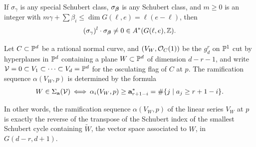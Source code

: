 \begin{corollary}\label{intersection with sigma nonzero}
If $\sigma_\gamma$ is any special Schubert class, $\sigma_{{\boldsymbol{\beta}}}$ is any Schubert class,
and $m\geq 0$ is an integer with $m \gamma + \sum \beta_i \leq \dim G(\ell, e) = \ell(e-\ell)$, then   
$$
(\sigma_\gamma)^l \cdot \sigma_{{\boldsymbol{\beta}}} \neq 0 \in A^*(G(\ell, e), {\mathbb Z}).
$$
\end{corollary}

\begin{proposition}\label{ramification}
Let $C \subset \mathbb P^d$ be a rational normal curve, and $(V_W, {\mathcal O}_C(1))$ be the $g^r_d$ on $\mathbb P^1$ cut by hyperplanes in $\mathbb P^d$ containing a plane $W \subset \mathbb P^d$ of dimension $d-r-1$, and write ${\mathcal V} = 0\subset V_1\subset \cdots \subset V_d = \mathbb P^d$ for the osculating flag of $C$ at $p$. The ramification sequence $\alpha(V_W, p)$
is determined by the formula
%
$$
W \in \Sigma_{\bf a}({\cal V}) \; \iff \; \alpha_i(V_W, p) \geq {\bf a}^*_{r+1-i} = \#\{j\mid a_j\geq r+1-i\}.
$$
\end{proposition} 
\def\tL{{\widetilde W}}
\def\tsV{{\widetilde \sV}}
\def\tV{{\widetilde V}}
In other words, the ramification sequence $\alpha(V_W, p)$ of the linear series $V_W$ at $p$ is exactly the reverse of the transpose of the Schubert index of the smallest Schubert cycle containing $\tL$, the vector
space associated to $W$, in  $G(d-r, d+1)$.

%


